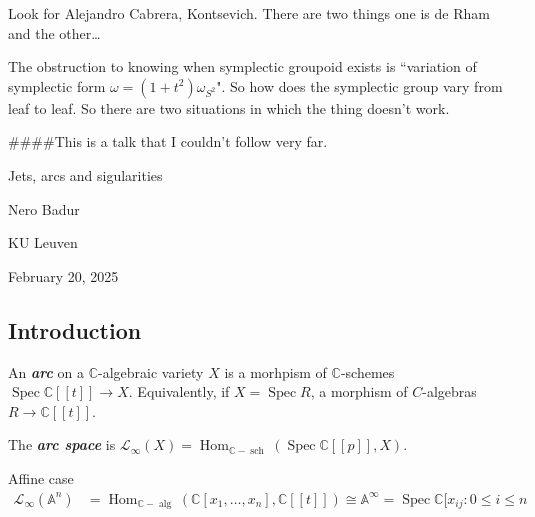 \begin{remark}\leavevmode
Look for Alejandro Cabrera, Kontsevich. There are two things one is de Rham and the other…
\end{remark}

\begin{upshot}\leavevmode
The obstruction to knowing when symplectic groupoid exists is ``variation of symplectic form \(\omega=(1+t^2) \omega_{S^2}\)". So how does the symplectic group vary from leaf to leaf. So there are two situations in which the thing doesn't work.
\end{upshot}

\iffalse
####This is a talk that I couldn't follow very far.

{\Huge Jets, arcs and sigularities}

\hfill{\Large Nero Badur}

{\Large \hfill KU Leuven}

\hfill{\large February 20, 2025}

\subsection{Introduction}

\begin{defn}\leavevmode
	An \textit{\textbf{arc}} on a \(\mathbb{C}\)-algebraic variety \(X\) is a morhpism of \(\mathbb{C}\)-schemes \(\operatorname{Spec}\mathbb{C}[[t]] \to X\). Equivalently, if \(X = \operatorname{Spec} R\), a morphism of \(C\)-algebras \(R \to \mathbb{C}[[t]]\).

	The \textit{\textbf{arc space}} is \(\mathcal{L}_\infty(X) = \operatorname{Hom}_{\mathbb{C}-\operatorname{s c h}}(\operatorname{Spec} \mathbb{C}[[p ]],X)\).
\end{defn}

\begin{thing6}{Affine case}\leavevmode
\begin{align*}
	\mathcal{L}_{\infty}(\mathbb{A}^n)&=\operatorname{Hom}_{\mathbb{C}-\operatorname{a l g}}(\mathbb{C}[x_1,\ldots,x_n],\mathbb{C}[ [ t ] ]) \cong \mathbb{A}^\infty= \operatorname{Spec} \mathbb{C}[x_{ij}:0 \leq  i \leq n
\end{align*}
\end{thing6}

